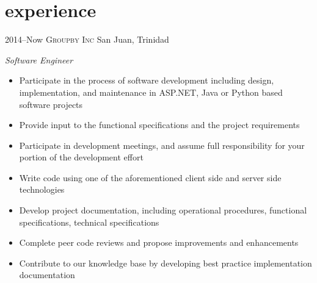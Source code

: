 \documentclass[]{friggeri-cv} %
\begin{document}

\section{experience}

\begin{entrylist}
\entry
{2014--Now}
{\textsc{Groupby Inc}}
{San Juan, Trinidad}
{\emph{Software Engineer} \\
\begin{itemize}
\item Participate in the process of software development including design, implementation, and maintenance in ASP.NET, Java or Python based software projects
\item Provide input to the functional specifications and the project requirements
\item Participate in development meetings, and assume full responsibility for your portion of the development effort
\item Write code using one of the aforementioned client side and server side technologies
\item Develop project documentation, including operational procedures, functional specifications, technical specifications
\item Complete peer code reviews and propose improvements and enhancements
\item Contribute to our knowledge base by developing best practice implementation documentation
\end{itemize}}
\end{entrylist}
\end{document}
